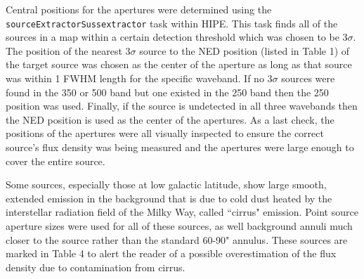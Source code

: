 Central positions for the apertures were determined using the \texttt{sourceExtractorSussextractor} task within HIPE. This task finds all of the sources in a map within a certain detection threshold which was chosen to be $3\sigma$. The position of the nearest $3\sigma$ source to the NED position (listed in Table 1) of the target source was chosen as the center of the aperture as long as that source was within 1 FWHM length for the specific waveband. If no $3\sigma$ sources were found in the 350 or 500 \um{} band but one existed in the 250 \um{} band then the 250 \um{} position was used. Finally, if the source is undetected in all three wavebands then the NED position is used as the center of the apertures. As a last check, the positions of the apertures were all visually inspected to ensure the correct source's flux density was being measured and the apertures were large enough to cover the entire source.

Some sources, especially those at low galactic latitude, show large smooth, extended emission in the background that is due to cold dust heated by the interstellar radiation field of the Milky Way, called ``cirrus" emission. Point source aperture sizes were used for all of these sources, as well background annuli much closer to the source rather than the standard 60-90" annulus. These sources are marked in Table 4 to alert the reader of a possible overestimation of the flux density due to contamination from cirrus.